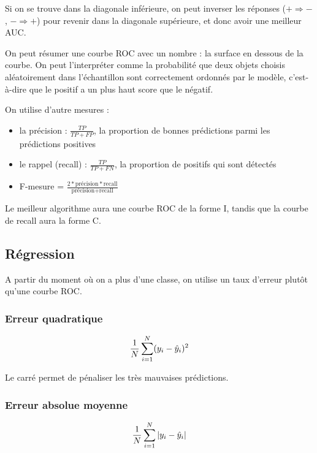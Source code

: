 	Si on se trouve dans la diagonale inférieure, on peut inverser les réponses ($+ \Rightarrow -$, $- \Rightarrow +$) pour revenir dans la diagonale supérieure, et donc avoir une meilleur AUC.
	
	
	On peut résumer une courbe ROC avec un nombre : la surface en dessous de la courbe. On peut l'interpréter comme la probabilité que deux objets choisis aléatoirement dans l'échantillon sont correctement ordonnés par le modèle, c'est-à-dire que le positif a un plus haut score que le négatif.
	
	On utilise d'autre mesures :
	
	\begin{itemize}
		\item la précision : $\frac{TP}{TP + FP}$, la proportion de bonnes prédictions parmi les prédictions positives
		\item le rappel (recall) : $\frac{TP}{TP + FN}$, la proportion de positifs qui sont détectés
		\item F-mesure = $\frac{2 * \text{précision} * \text{recall}}{\text{précision} + \text{recall}}$
	\end{itemize}
	
	
	Le meilleur algorithme aura une courbe ROC de la forme {\pigpenfont I}, tandis que la courbe de recall aura la forme {\pigpenfont C}.
	
	\subsection{Régression}
	
		A partir du moment où on a plus d'une classe, on utilise un taux d'erreur plutôt qu'une courbe ROC.
	
		\subsubsection{Erreur quadratique}
		
		$$\frac{1}{N} \sum_{i = 1}^N (y_i - \hat{y}_i)^2$$
		
		Le carré permet de pénaliser les très mauvaises prédictions.
		
		\subsubsection{Erreur absolue moyenne}
		
		$$\frac{1}{N} \sum_{i = 1}^N \vert y_i - \hat{y}_i \vert$$
		
